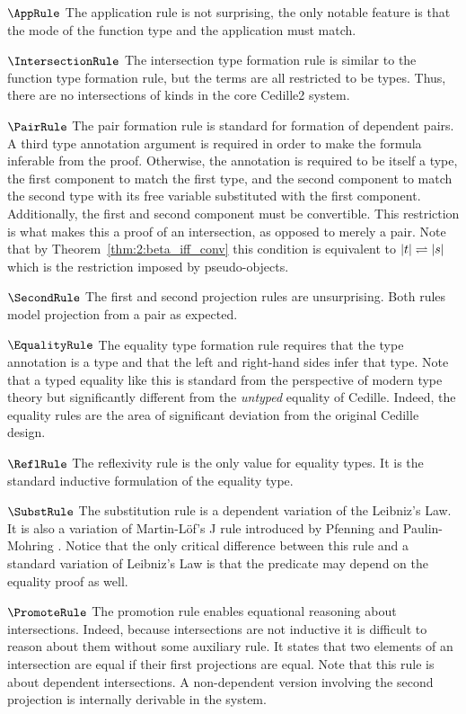 $\AppRule$ The application rule is not surprising, the only notable feature is that the mode of the function type and the application must match.

$\IntersectionRule$ The intersection type formation rule is similar to the function type formation rule, but the terms are all restricted to be types.
Thus, there are no intersections of kinds in the core Cedille2 system.

$\PairRule$ The pair formation rule is standard for formation of dependent pairs.
A third type annotation argument is required in order to make the formula inferable from the proof.
Otherwise, the annotation is required to be itself a type, the first component to match the first type, and the second component to match the second type with its free variable substituted with the first component.
Additionally, the first and second component must be convertible.
This restriction is what makes this a proof of an intersection, as opposed to merely a pair.
Note that by Theorem~\ref{thm:2:beta_iff_conv} this condition is equivalent to $|t| \rightleftharpoons |s|$ which is the restriction imposed by pseudo-objects.

$\SecondRule$ The first and second projection rules are unsurprising.
Both rules model projection from a pair as expected.

$\EqualityRule$ The equality type formation rule requires that the type annotation is a type and that the left and right-hand sides infer that type.
Note that a typed equality like this is standard from the perspective of modern type theory but significantly different from the \textit{untyped} equality of Cedille.
Indeed, the equality rules are the area of significant deviation from the original Cedille design.



$\ReflRule$ The reflexivity rule is the only value for equality types.
It is the standard inductive formulation of the equality type.

$\SubstRule$ The substitution rule is a dependent variation of the Leibniz's Law.
It is also a variation of Martin-L\"{o}f's J rule introduced by Pfenning and Paulin-Mohring \cite{pfenning1990_subst}.
Notice that the only critical difference between this rule and a standard variation of Leibniz's Law is that the predicate may depend on the equality proof as well.

$\PromoteRule$ The promotion rule enables equational reasoning about intersections.
Indeed, because intersections are not inductive it is difficult to reason about them without some auxiliary rule.
It states that two elements of an intersection are equal if their first projections are equal.
Note that this rule is about dependent intersections.
A non-dependent version involving the second projection is internally derivable in the system.


